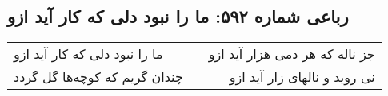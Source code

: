 \begin{center}
\section*{رباعی شماره ۵۹۲: ما را نبود دلی که کار آید ازو}
\label{sec:sh592}
\begin{longtable}{l p{0.5cm} r}
ما را نبود دلی که کار آید ازو
&&
جز ناله که هر دمی هزار آید ازو
\\
چندان گریم که کوچه‌ها گل گردد
&&
نی روید و نالهای زار آید ازو
\\
\end{longtable}
\end{center}
